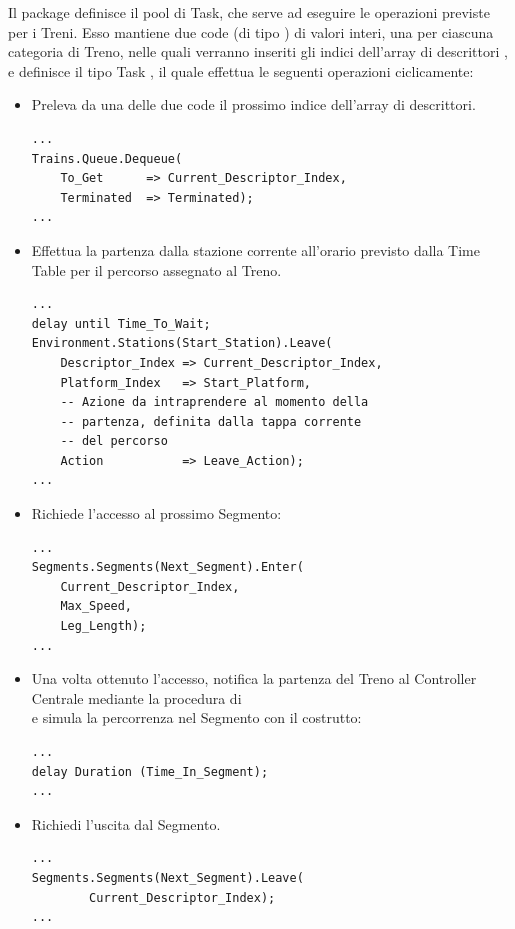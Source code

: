 	Il package  definisce il pool di Task, che serve ad eseguire le operazioni previste per i Treni. Esso mantiene due code (di tipo ) di valori interi, una per ciascuna categoria di Treno, nelle quali verranno inseriti gli indici dell'array di descrittori , e definisce il tipo Task , il quale effettua le seguenti operazioni ciclicamente:
	\begin{itemize}
		\item Preleva da una delle due code il prossimo indice dell'array di descrittori. 

\begin{lstlisting}
...
Trains.Queue.Dequeue(
	To_Get      => Current_Descriptor_Index,
	Terminated  => Terminated);
...
\end{lstlisting}

		\item Effettua la partenza dalla stazione corrente all'orario previsto dalla Time Table per il percorso assegnato al Treno.
\begin{lstlisting}
...
delay until Time_To_Wait;
Environment.Stations(Start_Station).Leave(
	Descriptor_Index => Current_Descriptor_Index,
	Platform_Index   => Start_Platform,
	-- Azione da intraprendere al momento della 
	-- partenza, definita dalla tappa corrente
	-- del percorso
	Action           => Leave_Action);
...
\end{lstlisting}
		 
		\item Richiede l'accesso al prossimo Segmento:

\begin{lstlisting}
...
Segments.Segments(Next_Segment).Enter(
	Current_Descriptor_Index,
	Max_Speed,
	Leg_Length);
...
\end{lstlisting}		
		\item Una volta ottenuto l'accesso, notifica la partenza del Treno al Controller Centrale mediante la procedura  di \\ e simula la percorrenza nel Segmento con il costrutto:

\begin{lstlisting}
...
delay Duration (Time_In_Segment);
...
\end{lstlisting}
		
		\item Richiedi l'uscita dal Segmento. 

\begin{lstlisting}
...
Segments.Segments(Next_Segment).Leave(
		Current_Descriptor_Index);
...
\end{lstlisting}	
	

\end{itemize}
